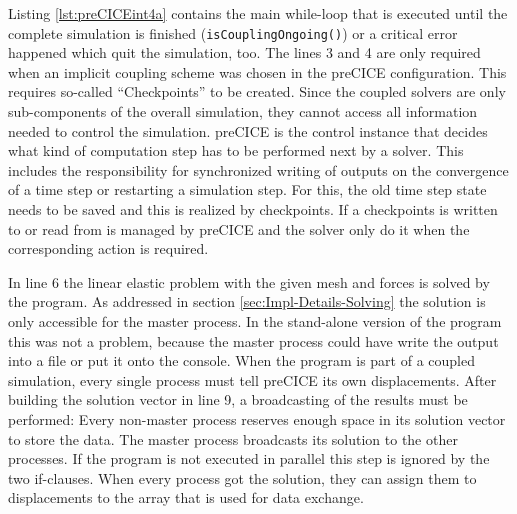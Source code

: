    Listing \ref{lst:preCICEint4a} contains the main while-loop that is executed until the complete simulation is finished (\texttt{isCouplingOngoing()}) or a critical error happened which quit the simulation, too. The lines 3 and 4 are only required when an implicit coupling scheme was chosen in the preCICE configuration. This requires so-called ``Checkpoints'' to be created. Since the coupled solvers are only sub-components of the overall simulation, they cannot access all information needed to control the simulation. preCICE is the control instance that decides what kind of computation step has to be performed next by a solver. This includes the responsibility for synchronized writing of outputs on the convergence of a time step or restarting a simulation step. For this, the old time step state needs to be saved and this is realized by checkpoints. If a checkpoints is written to or read from is managed by preCICE and the solver only do it when the corresponding action is required.
   
   In line 6 the linear elastic problem with the given mesh and forces is solved by the program. As addressed in section \ref{sec:Impl-Details-Solving} the solution is only accessible for the master process. In the stand-alone version of the program this was not a problem, because the master process could have write the output into a file or put it onto the console. When the program is part of a coupled simulation, every single process must tell preCICE its own displacements. After building the solution vector in line 9, a broadcasting of the results must be performed: Every non-master process reserves enough space in its solution vector to store the data. The master process broadcasts its solution to the other processes. If the program is not executed in parallel this step is ignored by the two if-clauses. When every process got the solution, they can assign them to displacements to the array that is used for data exchange.
   
